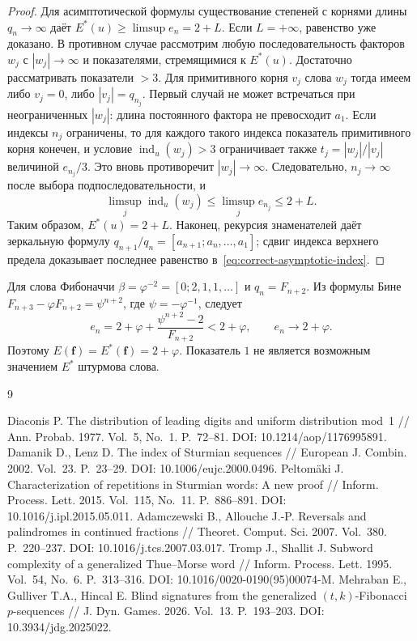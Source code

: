 \documentclass[12pt,a4paper]{article}
\begin{document}
\begin{proof}
Для асимптотической формулы существование степеней с корнями
длины $q_n\to\infty$ даёт
$E^*(u)\ge\limsup e_n=2+L$.
Если $L=+\infty$, равенство уже доказано.
В противном случае рассмотрим любую последовательность факторов
$w_j$ с $|w_j|\to\infty$ и показателями, стремящимися к $E^*(u)$.
Достаточно рассматривать показатели $>3$.
Для примитивного корня $v_j$ слова $w_j$ тогда имеем
либо $v_j=0$, либо $|v_j|=q_{n_j}$.
Первый случай не может встречаться при неограниченных $|w_j|$:
длина постоянного фактора не превосходит $a_1$.
Если индексы $n_j$ ограничены, то для каждого такого индекса
показатель примитивного корня конечен, и условие
$\operatorname{ind}_u(w_j)>3$ ограничивает также
$t_j=|w_j|/|v_j|$ величиной $e_{n_j}/3$.
Это вновь противоречит $|w_j|\to\infty$.
Следовательно, $n_j\to\infty$ после выбора подпоследовательности, и
\[
 \limsup_j\operatorname{ind}_u(w_j)
 \le\limsup_j e_{n_j}\le2+L.
\]
Таким образом, $E^*(u)=2+L$.
Наконец, рекурсия знаменателей даёт зеркальную формулу
$q_{n+1}/q_n=[a_{n+1};a_n,\ldots,a_1]$;
сдвиг индекса верхнего предела доказывает последнее равенство
в~\eqref{eq:correct-asymptotic-index}.
\end{proof}

\noindent Для слова Фибоначчи
$\beta=\varphi^{-2}=[0;2,1,1,\ldots]$ и $q_n=F_{n+2}$.
Из формулы Бине
$F_{n+3}-\varphi F_{n+2}=\psi^{n+2}$, где $\psi=-\varphi^{-1}$,
следует
\[
 e_n=2+\varphi+\frac{\psi^{n+2}-2}{F_{n+2}}<2+\varphi,
 \qquad e_n\longrightarrow2+\varphi.
\]
Поэтому $E(\mathbf f)=E^*(\mathbf f)=2+\varphi$.
Показатель $1$ не является возможным значением $E^*$ штурмова слова.
\begin{thebibliography}{9}

Diaconis P. The distribution of leading digits and uniform distribution mod~1 //
Ann. Probab. 1977. Vol.~5, No.~1. P.~72--81. DOI: 10.1214/aop/1176995891.
Damanik D., Lenz D. The index of Sturmian sequences //
European J. Combin. 2002. Vol.~23. P.~23--29. DOI: 10.1006/eujc.2000.0496.
Peltomäki J. Characterization of repetitions in Sturmian words: A new proof //
Inform. Process. Lett. 2015. Vol.~115, No.~11. P.~886--891.
DOI: 10.1016/j.ipl.2015.05.011.
Adamczewski B., Allouche J.-P. Reversals and palindromes in continued fractions //
Theoret. Comput. Sci. 2007. Vol.~380. P.~220--237.
DOI: 10.1016/j.tcs.2007.03.017.
Tromp J., Shallit J. Subword complexity of a generalized Thue--Morse word //
Inform. Process. Lett. 1995. Vol.~54, No.~6. P.~313--316.
DOI: 10.1016/0020-0190(95)00074-M.
Mehraban E., Gulliver T.A., Hincal E. Blind signatures from the generalized $(t,k)$-Fibonacci $p$-sequences // J. Dyn. Games. 2026. Vol.~13. P.~193--203. DOI: 10.3934/jdg.2025022.
\end{thebibliography}
\end{document}
